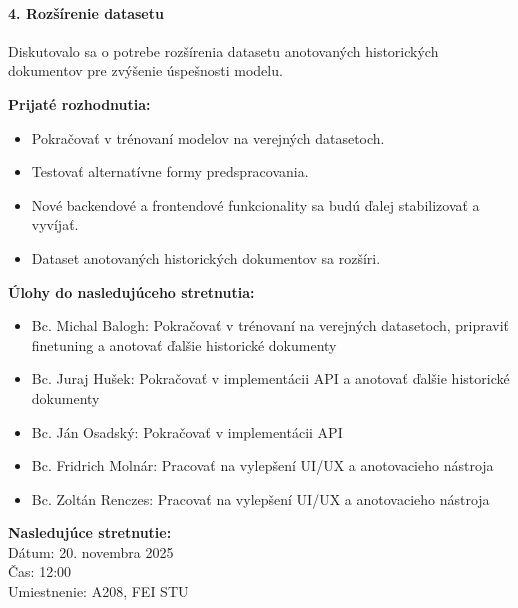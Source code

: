 \paragraph{4. Rozšírenie datasetu}
Diskutovalo sa o potrebe rozšírenia datasetu anotovaných historických dokumentov pre zvýšenie úspešnosti modelu.

\vspace{0.5cm}
\textbf{Prijaté rozhodnutia:}
\begin{itemize}
    \item Pokračovať v trénovaní modelov na verejných datasetoch.
    \item Testovať alternatívne formy predspracovania.
    \item Nové backendové a frontendové funkcionality sa budú ďalej stabilizovať a vyvíjať.
    \item Dataset anotovaných historických dokumentov sa rozšíri.
\end{itemize}

\vspace{0.5cm}
\textbf{Úlohy do nasledujúceho stretnutia:}
\begin{itemize}
    \item Bc. Michal Balogh: Pokračovať v trénovaní na verejných datasetoch, pripraviť finetuning a anotovať ďalšie historické dokumenty
    \item Bc. Juraj Hušek: Pokračovať v implementácii API a anotovať ďalšie historické dokumenty
    \item Bc. Ján Osadský: Pokračovať v implementácii API
    \item Bc. Fridrich Molnár: Pracovať na vylepšení UI/UX a anotovacieho nástroja
    \item Bc. Zoltán Renczes: Pracovať na vylepšení UI/UX a anotovacieho nástroja
\end{itemize}

\vspace{0.5cm}
\textbf{Nasledujúce stretnutie:} \\
Dátum: 20. novembra 2025 \\
Čas: 12:00 \\
Umiestnenie: A208, FEI STU

